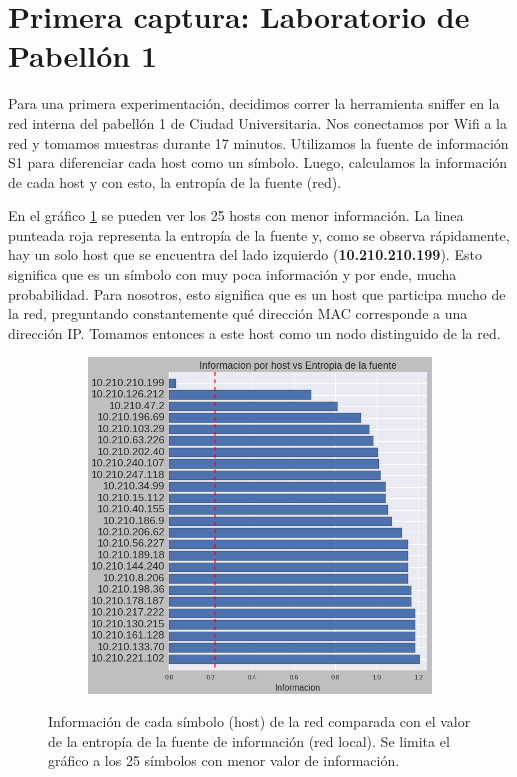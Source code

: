 \section{Primera captura: Laboratorio de Pabellón 1}

\par Para una primera experimentación, decidimos correr la herramienta sniffer en la red interna del pabellón 1 de Ciudad Universitaria. Nos conectamos por Wifi a la red y tomamos muestras durante 17 minutos. Utilizamos la fuente de información S1 para diferenciar cada host como un símbolo. Luego, calculamos la información de cada host y con esto, la entropía de la fuente (red).

\par En el gráfico \ref{fig:exp1_labo_infovsentro} se pueden ver los 25 hosts con menor información. La linea punteada roja representa la entropía de la fuente y, como se observa rápidamente, hay un solo host que se encuentra del lado izquierdo (\textbf{10.210.210.199}). Esto significa que es un símbolo con muy poca información y por ende, mucha probabilidad. Para nosotros, esto significa que es un host que participa mucho de la red, preguntando constantemente qué dirección MAC corresponde a una dirección IP. Tomamos entonces a este host como un nodo distinguido de la red.

\begin{figure}[h]
  \begin{subfigure}[b]{.5\textwidth}
    \includegraphics[width=\textwidth]{imagenes/laboratorio/informaciones_vs_entropia.png}
  \end{subfigure}
  \label{fig:exp1_labo_infovsentro}
  \caption{Información de cada símbolo (host) de la red comparada con el valor de la entropía de la fuente de información (red local). Se limita el gráfico a los 25 símbolos con menor valor de información.}
\end{figure}

